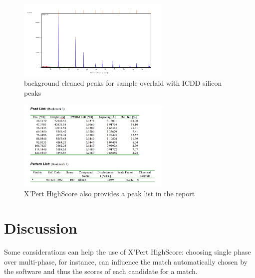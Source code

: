 \documentclass{article}
\begin{document}
\begin{figure}[h]
\begin{center}
\includegraphics[width=0.65\textwidth]{peaks} %
\caption{background cleaned peaks for sample overlaid with ICDD silicon peaks }
\end{center}
\end{figure}

\begin{figure}[h]
\begin{center}
\includegraphics[width=0.65\textwidth]{peaklist} %
\caption{X'Pert HighScore also provides a peak list in the report}
\end{center}
\end{figure}


\section{Discussion}
Some considerations can help the use of X'Pert HighScore: choosing single phase over multi-phase, for instance, can influence the match automatically chosen by the software and thus the scores of each candidate for a match.  


\end{document}
